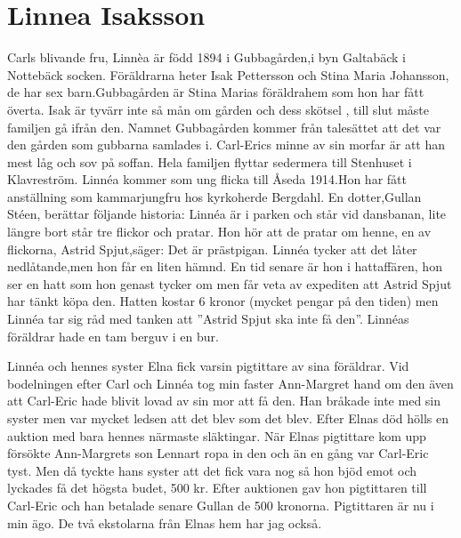 \chapter{Linnea Isaksson}
\label{linnea_isaksson}
Carls blivande fru, Linnèa är född 1894 i Gubbagården,i byn Galtabäck i Nottebäck socken. Föräldrarna heter Isak Pettersson och Stina Maria Johansson, de har sex barn.Gubbagården är Stina Marias föräldrahem som hon har fått överta. Isak är tyvärr inte så mån om gården och dess skötsel , till slut måste familjen gå ifrån den. Namnet Gubbagården kommer från talesättet att det var den gården som gubbarna samlades i. Carl-Erics minne av sin morfar är att han mest låg och sov på soffan. Hela familjen flyttar sedermera till Stenhuset i Klavreström. Linnéa kommer som ung flicka till Åseda 1914.Hon har fått anställning som kammarjungfru hos kyrkoherde Bergdahl. En dotter,Gullan Stéen, berättar följande historia: Linnéa är i parken och står vid dansbanan, lite längre bort står tre flickor och pratar. Hon hör att de pratar om henne, en av flickorna, Astrid Spjut,säger: Det är prästpigan. Linnéa tycker att det låter nedlåtande,men hon får en liten hämnd. En tid senare är hon i hattaffären, hon ser en hatt som hon genast tycker om men får veta av expediten att Astrid Spjut har tänkt köpa den. Hatten kostar 6 kronor (mycket pengar på den tiden) men Linnéa tar sig råd med tanken att ”Astrid Spjut ska inte få den”.
Linnéas föräldrar hade en tam berguv i en bur.

Linnéa och hennes syster Elna fick varsin pigtittare av sina föräldrar. Vid bodelningen efter Carl och Linnéa tog min faster Ann-Margret hand om den även att Carl-Eric hade blivit lovad av sin mor  att få den. Han bråkade inte med sin syster men var mycket ledsen att det blev som det blev.
Efter Elnas död hölls en auktion med bara hennes närmaste släktingar. När Elnas pigtittare kom upp försökte Ann-Margrets son Lennart ropa in den och än en gång var Carl-Eric tyst. Men då tyckte hans syster att det fick vara nog så hon bjöd emot och lyckades få det högsta budet, 500 kr. Efter auktionen gav hon pigtittaren till Carl-Eric och han betalade senare Gullan de 500 kronorna.
Pigtittaren är nu i min ägo. 
De två ekstolarna från Elnas hem har jag också.

